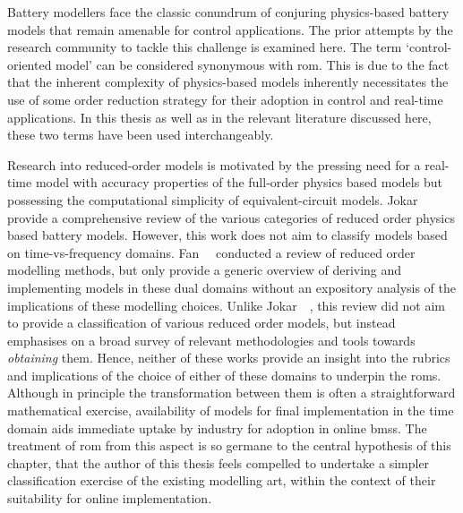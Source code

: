 
Battery modellers face the classic  conundrum of conjuring physics-based battery
models that remain amenable for control  applications. The prior attempts by the
research  community  to  tackle  this  challenge  is  examined  here.  The  term
`control-oriented model'  can be considered  synonymous with \gls{rom}.  This is
due to the fact that the  inherent complexity of physics-based models inherently
necessitates the  use of  some order  reduction strategy  for their  adoption in
control and  real-time applications. In this  thesis as well as  in the relevant
literature discussed here, these two terms have been used interchangeably.

Research  into reduced-order  models is  motivated by  the pressing  need for  a
real-time  model  with  accuracy  properties of  the  full-order  physics  based
models  but  possessing  the   computational  simplicity  of  equivalent-circuit
models.
Jokar~\etal~\cite{Jokar2016}  provide  a  comprehensive review  of  the  various
categories  of  reduced  order  physics  based  battery  models.  However,  this
work  does  not aim  to  classify  models  based on  time-vs-frequency  domains.
Fan~\etal{}~\cite{Fan2015}  conducted  a  review   of  reduced  order  modelling
methods, but only provide a generic overview of deriving and implementing models
in these  dual domains  without an  expository analysis  of the  implications of
these modelling  choices. Unlike  Jokar~\etal~\cite{Jokar2016}, this  review did
not aim to provide a classification of various reduced order models, but instead
emphasises  on  a broad  survey  of  relevant  methodologies and  tools  towards
\emph{obtaining} them.  Hence, neither  of these works  provide an  insight into
the  rubrics and  implications  of the  choice  of either  of  these domains  to
underpin  the  \glspl{rom}. Although  in  principle  the transformation  between
them  is  often  a straightforward  mathematical  exercise,  availability of models for final  implementation in the time domain aids
immediate uptake by  industry for adoption in online  \glspl{bms}. The treatment
of \gls{rom} from  this aspect is so  germane to the central  hypothesis of this
chapter, that the author
of this thesis feels compelled to undertake a simpler classification exercise of
the existing modelling  art, within the context of their  suitability for online
implementation.


